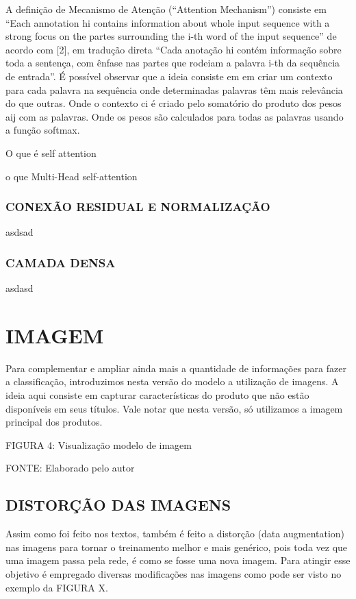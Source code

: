 A definição de Mecanismo de Atenção (“Attention Mechanism”) consiste em “Each annotation hi contains information about whole input sequence with a strong focus on the partes surrounding the i-th word of the input sequence” de acordo com [2], em tradução direta “Cada anotação hi contém informação sobre toda a sentença, com ênfase nas partes que rodeiam a palavra i-th da sequência de entrada”.
É possível observar que a ideia consiste em em criar um contexto para cada palavra na sequência onde determinadas palavras têm mais relevância do que outras.
Onde o contexto ci é criado pelo somatório do produto dos pesos aij com as palavras. Onde os pesos são calculados para todas as palavras usando a função softmax.

O que é self attention

o que Multi-Head self-attention


\subsubsection{CONEXÃO RESIDUAL E NORMALIZAÇÃO}
asdsad

\subsubsection{CAMADA DENSA}
asdasd


\section{IMAGEM}

Para complementar e ampliar ainda mais a quantidade de informações para fazer a classificação, introduzimos nesta versão do modelo a utilização de imagens. A ideia aqui consiste em capturar características do produto que não estão disponíveis em seus títulos.
Vale notar que nesta versão, só utilizamos a imagem principal dos produtos.

FIGURA 4: Visualização modelo de imagem

FONTE: Elaborado pelo autor


\subsection{DISTORÇÃO DAS IMAGENS}

Assim como foi feito nos textos, também é feito a distorção (data augmentation) nas imagens para tornar o treinamento melhor e mais genérico, pois toda vez que uma imagem passa pela rede, é como se fosse uma nova imagem. Para atingir esse objetivo é empregado diversas modificações nas imagens como pode ser visto no exemplo da FIGURA X.

